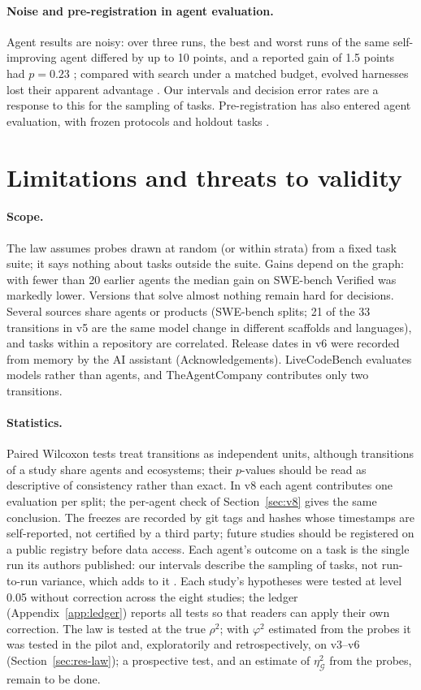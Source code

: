 \documentclass[11pt]{article}
\newcommand{\phisq}{\varphi^2}
\begin{document}
\paragraph{Noise and pre-registration in agent evaluation.} Agent results are noisy: over three runs, the best and
worst runs of the same self-improving agent differed by up to 10 points, and a reported gain of 1.5 points had
$p=0.23$ \citep{ye2026fragility}; compared with search under a matched budget, evolved harnesses lost their apparent
advantage \citep{wang2026harnessevo}. Our intervals and decision error rates are a response to this for the
sampling of tasks. Pre-registration has also entered agent evaluation, with frozen protocols and holdout tasks
\citep{weinberger2026waste}.

\section{Limitations and threats to validity}\label{sec:limits}
\paragraph{Scope.} The law assumes probes drawn at random (or within strata) from a fixed task suite; it says nothing
about tasks outside the suite. Gains depend on the graph: with fewer than 20 earlier agents the median gain on SWE-bench Verified
was markedly lower. Versions that solve almost nothing remain hard for decisions. Several sources share agents or
products (SWE-bench splits; 21 of the 33 transitions in v5 are the same model change in different scaffolds and
languages), and tasks within a repository are correlated. Release dates in v6 were recorded from memory by the
AI assistant (Acknowledgements). LiveCodeBench evaluates models rather than agents, and TheAgentCompany
contributes only two transitions.

\paragraph{Statistics.} Paired Wilcoxon tests treat transitions as independent units, although transitions of a study
share agents and ecosystems; their $p$-values should be read as descriptive of consistency rather than exact. In v8 each agent contributes one
evaluation per split; the per-agent check of Section~\ref{sec:v8} gives the same conclusion. The freezes are
recorded by git tags and hashes whose timestamps are self-reported, not certified by a third party; future studies
should be registered on a public registry before data access. Each agent's outcome on a task is the single run
its authors published: our intervals describe the sampling of tasks, not run-to-run variance, which adds to it
\citep{ye2026fragility}. Each study's hypotheses were tested at level 0.05 without correction across the eight studies; the ledger
(Appendix~\ref{app:ledger}) reports all \HypTotal{} tests so that readers can apply their own correction. The law is
tested at the true $\rho^2$; with $\phisq$ estimated from the probes it was tested in the pilot and, exploratorily and
retrospectively, on v3--v6 (Section~\ref{sec:res-law}); a prospective test, and an estimate of $\eta^2_{\mathcal G}$
from the probes, remain to be done.
\end{document}

